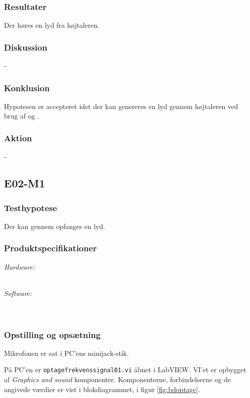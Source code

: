 		\subsubsection{Resultater}
		Der høres en lyd fra højtaleren. 
		\subsubsection{Diskussion} 
		-
		\subsubsection{Konklusion}
		Hypotesen er accepteret idet der kan genereres en lyd gennem højtaleren ved brug af \arduino{} og \labview. 
		
		\subsubsection{Aktion}
		- 
		
	\subsection{E02-M1}
		\subsubsection{Testhypotese}
		Der kan gennem \mikrofon opfanges en lyd. 
		
		\subsubsection{Produktspecifikationer}
	
			\textit{Hardware:}\\
			\mikrofon\\
			\PC
	
			\textit{Software:}\\
			\labview\\
			\onlineg\\
	
		\subsubsection{Opstilling og opsætning}
		Mikrofonen er sat i PC'ens minijack-stik. 
	  
			På PC'en er \texttt{optagefrekvenssignal01.vi} åbnet i LabVIEW. VI'et er opbygget af \textit{Graphics and sound} komponenter. Komponenterne, forbindelserne og de angivede værdier er vist i blokdiagrammet, i figur \ref{fig:bdoptage}.   \\   
	
